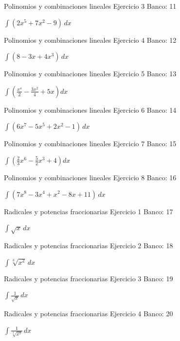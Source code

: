 \documentclass[aspectratio=169,12pt]{beamer}
\newcommand{\ejercicio}[1]{%
  \begin{center}
  \vfill
  {\fontsize{24}{30}\selectfont #1}
  \vfill
  \end{center}
}
\begin{document}
\begin{frame}{Polinomios y combinaciones lineales}
\small Ejercicio 3 \hfill Banco: 11
\ejercicio{$\displaystyle \int(2x^5+7x^2-9)\,dx$}
\end{frame}

\begin{frame}{Polinomios y combinaciones lineales}
\small Ejercicio 4 \hfill Banco: 12
\ejercicio{$\displaystyle \int(8-3x+4x^3)\,dx$}
\end{frame}

\begin{frame}{Polinomios y combinaciones lineales}
\small Ejercicio 5 \hfill Banco: 13
\ejercicio{$\displaystyle \int\left(\frac{x^4}{2}-\frac{3x^2}{4}+5x\right)dx$}
\end{frame}

\begin{frame}{Polinomios y combinaciones lineales}
\small Ejercicio 6 \hfill Banco: 14
\ejercicio{$\displaystyle \int(6x^7-5x^5+2x^2-1)\,dx$}
\end{frame}

\begin{frame}{Polinomios y combinaciones lineales}
\small Ejercicio 7 \hfill Banco: 15
\ejercicio{$\displaystyle \int\left(\frac{2}{3}x^6-\frac{5}{2}x^3+4\right)dx$}
\end{frame}

\begin{frame}{Polinomios y combinaciones lineales}
\small Ejercicio 8 \hfill Banco: 16
\ejercicio{$\displaystyle \int(7x^8-3x^4+x^2-8x+11)\,dx$}
\end{frame}

\begin{frame}{Radicales y potencias fraccionarias}
\small Ejercicio 1 \hfill Banco: 17
\ejercicio{$\displaystyle \int \sqrt{x}\,dx$}
\end{frame}

\begin{frame}{Radicales y potencias fraccionarias}
\small Ejercicio 2 \hfill Banco: 18
\ejercicio{$\displaystyle \int \sqrt[3]{x^2}\,dx$}
\end{frame}

\begin{frame}{Radicales y potencias fraccionarias}
\small Ejercicio 3 \hfill Banco: 19
\ejercicio{$\displaystyle \int \frac{1}{\sqrt{x}}\,dx$}
\end{frame}

\begin{frame}{Radicales y potencias fraccionarias}
\small Ejercicio 4 \hfill Banco: 20
\ejercicio{$\displaystyle \int \frac{1}{\sqrt[3]{x^2}}\,dx$}
\end{frame}
\end{document}

